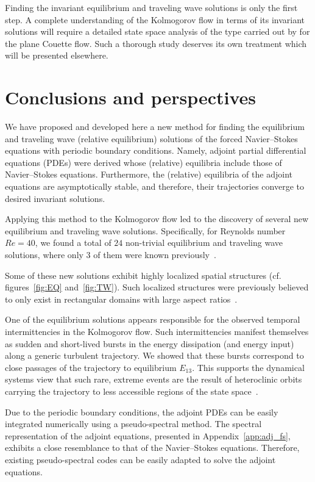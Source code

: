 \documentclass{article}
\begin{document}
Finding the invariant equilibrium and traveling wave solutions is only the first step.
A complete understanding of the Kolmogorov flow in terms of its invariant solutions
will require a detailed state space analysis of the type carried out by for
the plane Couette flow. Such a thorough study deserves its own treatment which will be
presented elsewhere.

\section{Conclusions and perspectives}
\label{sec:conclude}
We have  proposed and developed here a new
method for finding the equilibrium and traveling wave (relative
equilibrium) solutions of
the forced Navier--Stokes equations with periodic boundary conditions.
Namely, adjoint partial differential equations (PDEs) were derived whose (relative) equilibria
include those of Navier--Stokes equations. Furthermore, the (relative) equilibria of the adjoint
equations are asymptotically stable, and therefore, their trajectories converge to desired
invariant
solutions.

Applying this method to the Kolmogorov flow led to the discovery of several new
equilibrium and traveling wave solutions. Specifically, for Reynolds number $Re=40$,
we found a total of $24$ non-trivial equilibrium and traveling wave solutions,
where only $3$ of them were known previously~\citep{CK13}.

Some of these new solutions exhibit highly localized spatial structures
(cf. figures~\ref{fig:EQ} and~\ref{fig:TW}). Such localized structures were
previously believed to only exist in rectangular domains with
large aspect ratios~\citep{SGB10,LK14}.

One of the equilibrium solutions appears responsible for the
observed temporal intermittencies in the Kolmogorov flow. Such intermittencies manifest
themselves as sudden and short-lived bursts in the energy dissipation (and energy input)
along a generic turbulent trajectory. We showed that these bursts correspond to
close passages of the trajectory to equilibrium $E_{13}$. This supports the
dynamical systems view that such rare, extreme events are the result of heteroclinic
orbits carrying the trajectory to less accessible regions of the state space~\citep{holmes93}.

Due to the periodic boundary conditions, the adjoint PDEs can be easily integrated numerically using
a pseudo-spectral method. The spectral representation of the adjoint equations, presented
in Appendix~\ref{app:adj_fs}, exhibits a close resemblance to that of the Navier--Stokes equations.
Therefore, existing pseudo-spectral codes can be easily adapted to solve the adjoint equations.
\end{document}
